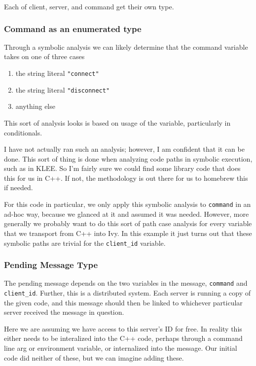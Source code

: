 \documentclass[11pt]{article}
\begin{document}
Each of client, server, and command get their own type.

\subsubsection{Command as an enumerated type}
\label{sec:org68c6b5f}
Through a symbolic analysis we can likely determine that the command variable takes on one of three cases
\begin{enumerate}
\item the string literal \texttt{"connect"}
\item the string literal \texttt{"disconnect"}
\item anything else
\end{enumerate}

This sort of analysis looks is based on usage of the variable, particularly in conditionals.

I have not actually ran such an analysis; however, I am confident that it can be done. This sort of thing is done when analyzing code paths in symbolic execution, such as in KLEE. So I'm fairly sure we could find some library code that does this for us in C++. If not, the methodology is out there for us to homebrew this if needed.

For this code in particular, we only apply this symbolic analysis to \texttt{command} in an ad-hoc way, because we glanced at it and assumed it was needed. However, more generally we probably want to do this sort of path case analysis for every variable that we transport from C++ into Ivy. In this example it just turns out that these symbolic paths are trivial for the \texttt{client\_id} variable.

\subsubsection{Pending Message Type}
\label{sec:orgebe2eed}
The pending message depends on the two variables in the message, \texttt{command} and \texttt{client\_id}. Further, this is a distributed system. Each server is running a copy of the given code, and this message should then be linked to whichever particular server received the message in question.

Here we are assuming we have access to this server's ID for free. In reality this either needs to be interalized into the C++ code, perhaps through a command line arg or environment variable, or internalized into the message. Our initial code did neither of these, but we can imagine adding these.
\end{document}
